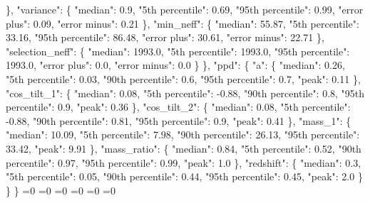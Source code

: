 {{        \}, %
        "variance": \{%
          "median": 0.9, %
          "5th percentile": 0.69, %
          "95th percentile": 0.99, %
          "error plus": 0.09, %
          "error minus": 0.21%
        \}, %
        "min\_neff": \{%
          "median": 55.87, %
          "5th percentile": 33.16, %
          "95th percentile": 86.48, %
          "error plus": 30.61, %
          "error minus": 22.71%
        \}, %
        "selection\_neff": \{%
          "median": 1993.0, %
          "5th percentile": 1993.0, %
          "95th percentile": 1993.0, %
          "error plus": 0.0, %
          "error minus": 0.0%
        \}%
      \}, %
      "ppd": \{%
        "a": \{%
          "median": 0.26, %
          "5th percentile": 0.03, %
          "90th percentile": 0.6, %
          "95th percentile": 0.7, %
          "peak": 0.11%
        \}, %
        "cos\_tilt\_1": \{%
          "median": 0.08, %
          "5th percentile": {-}0.88, %
          "90th percentile": 0.8, %
          "95th percentile": 0.9, %
          "peak": 0.36%
        \}, %
        "cos\_tilt\_2": \{%
          "median": 0.08, %
          "5th percentile": {-}0.88, %
          "90th percentile": 0.81, %
          "95th percentile": 0.9, %
          "peak": 0.41%
        \}, %
        "mass\_1": \{%
          "median": 10.09, %
          "5th percentile": 7.98, %
          "90th percentile": 26.13, %
          "95th percentile": 33.42, %
          "peak": 9.91%
        \}, %
        "mass\_ratio": \{%
          "median": 0.84, %
          "5th percentile": 0.52, %
          "90th percentile": 0.97, %
          "95th percentile": 0.99, %
          "peak": 1.0%
        \}, %
        "redshift": \{%
          "median": 0.3, %
          "5th percentile": 0.05, %
          "90th percentile": 0.44, %
          "95th percentile": 0.45, %
          "peak": 2.0%
        \}%
      \}%
    \}}%
  \else%
    \ifnum{}=0%
      \def\MagTruncnormIidTiltIsotropicTruncnormNnd@out{%
    {-}1031.97}%
    \else%
      \ifnum{}=0%
      \def\MagTruncnormIidTiltIsotropicTruncnormNnd@out{%
    0.24}%
    \else%
      \ifnum{}=0%
      \def\MagTruncnormIidTiltIsotropicTruncnormNnd@out{%
    0.33}%
    \else%
      \ifnum{}=0%
      \def\MagTruncnormIidTiltIsotropicTruncnormNnd@out{%
    0.98}%
    \else%
      \ifnum{}=0%
      \let\MagTruncnormIidTiltIsotropicTruncnormNnd@out\MagTruncnormIidTiltIsotropicTruncnormNnd@I%
    \else%
      \ifnum{}=0%
}
